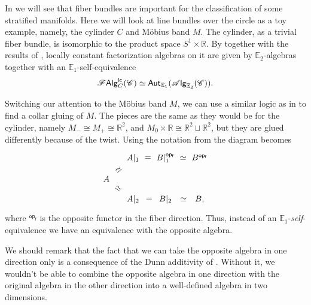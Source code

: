 \documentclass[../text]{subfiles}
\begin{document}
\begin{example}\label{ex:cylinder_mobius_band}
    In  we will see that fiber bundles are important for the classification of some stratified manifolds. Here we will look at line bundles over the circle as a toy example, namely, the cylinder $C$ and M\"obius band $M$. The cylinder, as a trivial fiber bundle, is isomorphic to the product space $S^1 \times \mathbb{R}$. By  together with the results of , locally constant factorization algebras on it are given by $\mathbb{E}_2$-algebras together with an $\mathbb{E}_1$-self-equivalence
    \begin{align}
        \mathscr{F} \mathsf{Alg}^{\mathsf{lc}}_C (\mathscr{C}) \simeq \mathsf{Aut}_{\mathbb{E}_1} (\mathscr{A} \mathsf{lg}_{\mathbb{E}_2} (\mathscr{C})).
    \end{align}

    Switching our attention to the M\"obius band $M$, we can use a similar logic as in  to find a collar gluing of $M$. The pieces are the same as they would be for the cylinder, namely $M_- \cong M_+ \cong \mathbb{R}^2$, and $M_0 \times \mathbb{R} \cong \mathbb{R}^2 \sqcup \mathbb{R}^2$, but they are glued differently because of the twist. Using the notation from  the diagram becomes
    \begin{equation}
        \begin{tikzcd}[row sep = small, column sep= small]
            & A|_1 \arrow[r, phantom, "=", description] & B|_1^{\mathsf{op_f}} \arrow[r, phantom, "\simeq", description] & B^{\mathsf{op_f}} \\
            A \arrow[ru, phantom, "\simeq", sloped, description] \arrow[rd, phantom, "\simeq", sloped, description] & & & \\
            & A|_2 \arrow[r, phantom, "=", description] & B|_2 \arrow[r, phantom, "\simeq", description] & B,
        \end{tikzcd}
    \end{equation}
    where $^{\mathsf{op_f}}$ is the opposite functor in the fiber direction. Thus, instead of an $\mathbb{E}_1$-\emph{self}-equivalence we have an equivalence with the opposite algebra.

    We should remark that the fact that we can take the opposite algebra in one direction only is a consequence of the Dunn additivity of . Without it, we wouldn't be able to combine the opposite algebra in one direction with the original algebra in the other direction into a well-defined algebra in two dimensions.
\end{example}
\end{document}

